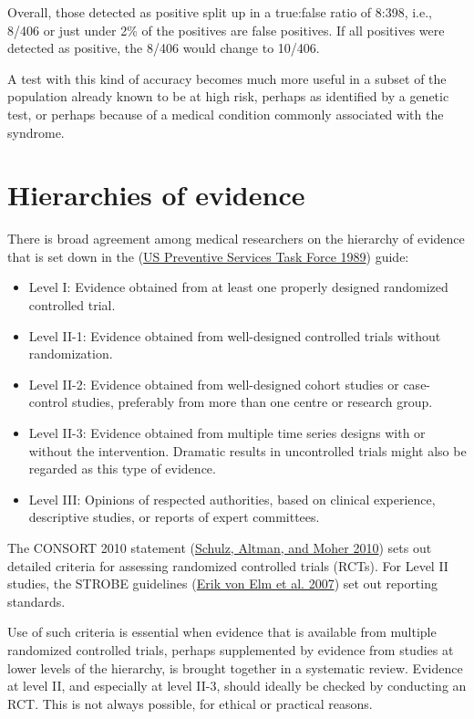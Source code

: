 \documentclass[
  10ptls,
  b5paper]{book}
\providecommand{\tightlist}{%
  \setlength{\itemsep}{0pt}\setlength{\parskip}{0pt}}
\begin{document}
Overall, those detected as positive split up in a true:false ratio of
8:398, i.e., 8/406 or just under 2\% of the positives are false
positives. If all positives were detected as positive, the 8/406 would
change to 10/406.

A test with this kind of accuracy becomes much more useful in a subset
of the population already known to be at high risk, perhaps as
identified by a genetic test, or perhaps because of a medical condition
commonly associated with the syndrome.

\hypertarget{hierarchies-of-evidence}{%
\section{Hierarchies of evidence}\label{hierarchies-of-evidence}}

There is broad agreement among medical researchers on the hierarchy of
evidence that is set down in the (\protect\hyperlink{ref-us1989guide}{US Preventive Services Task Force 1989}) guide:

\begin{itemize}
\tightlist
\item
  Level I: Evidence obtained from at least one properly designed
  randomized controlled trial.
\item
  Level II-1: Evidence obtained from well-designed controlled trials
  without randomization.
\item
  Level II-2: Evidence obtained from well-designed cohort studies or
  case-control studies, preferably from more than one centre or
  research group.
\item
  Level II-3: Evidence obtained from multiple time series designs with
  or without the intervention. Dramatic results in uncontrolled trials
  might also be regarded as this type of evidence.
\item
  Level III: Opinions of respected authorities, based on clinical
  experience, descriptive studies, or reports of expert committees.
\end{itemize}

The CONSORT 2010 statement (\protect\hyperlink{ref-Schulzc332}{Schulz, Altman, and Moher 2010}) sets out detailed criteria for
assessing randomized controlled trials (RCTs). For Level II studies, the
STROBE guidelines (\protect\hyperlink{ref-erik2007strengthening}{Erik von Elm et al. 2007}) set out reporting standards.

Use of such criteria is essential when evidence that is available from
multiple randomized controlled trials, perhaps supplemented by evidence
from studies at lower levels of the hierarchy, is brought together in a
systematic review. Evidence at level II, and especially at level II-3,
should ideally be checked by conducting an RCT. This is not always
possible, for ethical or practical reasons.
\end{document}
